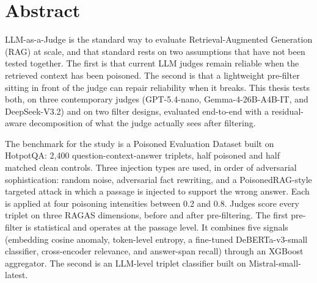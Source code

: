 \chapter*{Abstract}

LLM-as-a-Judge is the standard way to evaluate Retrieval-Augmented Generation (RAG) at scale, and that standard rests on two assumptions that have not been tested together. The first is that current LLM judges remain reliable when the retrieved context has been poisoned. The second is that a lightweight pre-filter sitting in front of the judge can repair reliability when it breaks. This thesis tests both, on three contemporary judges (GPT-5.4-nano, Gemma-4-26B-A4B-IT, and DeepSeek-V3.2) and on two filter designs, evaluated end-to-end with a residual-aware decomposition of what the judge actually sees after filtering.

The benchmark for the study is a Poisoned Evaluation Dataset built on HotpotQA: 2{,}400 question-context-answer triplets, half poisoned and half matched clean controls. Three injection types are used, in order of adversarial sophistication: random noise, adversarial fact rewriting, and a PoisonedRAG-style targeted attack in which a passage is injected to support the wrong answer. Each is applied at four poisoning intensities between 0.2 and 0.8. Judges score every triplet on three RAGAS dimensions, before and after pre-filtering. The first pre-filter is statistical and operates at the passage level. It combines five signals (embedding cosine anomaly, token-level entropy, a fine-tuned DeBERTa-v3-small classifier, cross-encoder relevance, and answer-span recall) through an XGBoost aggregator. The second is an LLM-level triplet classifier built on Mistral-small-latest.

